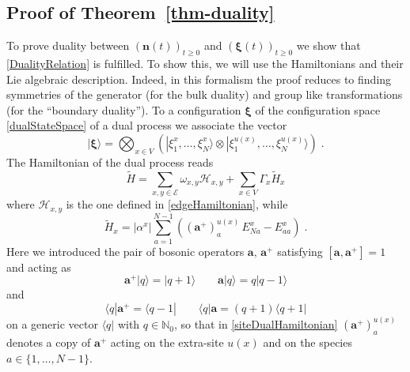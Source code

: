 \documentclass[10pt]{article}
\numberwithin{equation}{section}
\numberwithin{equation}{subsection}
\newcommand{\dt}{\;.}
\begin{document}
\subsection{Proof of Theorem~\ref{thm-duality}}
\label{proof-th-duality}
To prove duality between $(\bm{n}(t))_{t\geq 0}$ and $(\bm{\xi}(t))_{t\geq 0}$ we  show that \eqref{DualityRelation} is fulfilled.  To show this, we will use the Hamiltonians and their Lie algebraic description. Indeed, in this formalism the proof 
reduces to finding symmetries of the generator (for the bulk duality) and group like transformations (for the ``boundary duality'').
To a configuration $\bm{\xi}$ of the configuration space  \eqref{dualStateSpace} of a dual process we associate the vector
\begin{equation}
    |\bm{\xi}\rangle=\bigotimes_{x\in V}\left(|\xi_{1}^{x},\ldots,\xi_{N}^{x}\rangle\otimes |\xi_{1}^{u(x)},\ldots,\xi_{N}^{u(x)}\rangle\right)\dt
\end{equation}
The Hamiltonian of the dual process reads
\begin{equation}\label{DualHamiltonian}
    \widetilde{H}=\sum_{x,y\in \mathcal{E}}\omega_{x,y}\mathcal{H}_{x,y}+\sum_{x\in V}\Gamma_{x}\widetilde{H}_{x}
\end{equation}
where $\mathcal{H}_{x,y}$ is the one defined in \eqref{edgeHamiltonian}, while 
\begin{equation}\label{siteDualHamiltonian}
    \widetilde{H}_{x}=|\alpha^{x}|\sum_{a=1}^{N-1}\left((\mathbf{a}^{+})_{a}^{u(x)}\,E_{Na}^{x}-E_{aa}^{x}\right)\dt
\end{equation}
Here we introduced the pair of bosonic operators $\mathbf{a},\,\mathbf{a}^{+}$ satisfying $[\mathbf{a},\mathbf{a}^{+}]=1$ and acting as
\begin{equation}
	\mathbf{a}^{+}|q\rangle=|q+1\rangle\qquad \mathbf{a}|q\rangle=q|q-1\rangle
\end{equation}
and 
\begin{equation}
	\langle q|\mathbf{a}^{+}=\langle q-1|\qquad \langle q|\mathbf{a}=(q+1) \langle q+1|
\end{equation}
on a generic vector $\langle q|$ with $q\in \mathbb{N}_{0}$, so that in \eqref{siteDualHamiltonian} 
$(\mathbf{a}^{+})_{a}^{u(x)}$ denotes a copy of $\mathbf{a}^{+}$ acting on the extra-site $u(x)$ and on the species $a\in\{1,\ldots,N-1\}$. \\
\end{document}
